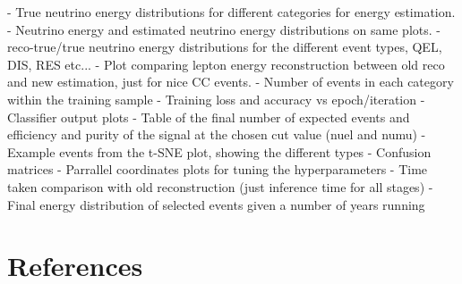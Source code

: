 - True neutrino energy distributions for different categories for energy estimation.
- Neutrino energy and estimated neutrino energy distributions on same plots.
- reco-true/true neutrino energy distributions for the different event types, QEL, DIS, RES etc...
- Plot comparing lepton energy reconstruction between old reco and new estimation, just for nice CC events.
- Number of events in each category within the training sample
- Training loss and accuracy vs epoch/iteration
- Classifier output plots
- Table of the final number of expected events and efficiency and purity of the signal at the chosen cut value (nuel and numu)
- Example events from the t-SNE plot, showing the different types
- Confusion matrices
- Parrallel coordinates plots for tuning the hyperparameters
- Time taken comparison with old reconstruction (just inference time for all stages)
- Final energy distribution of selected events given a number of years running

\section{References}

